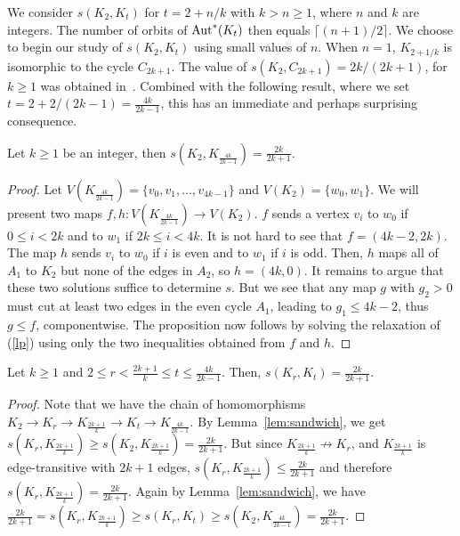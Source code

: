 \documentclass[11pt,a4paper]{article}
\begin{document}
We consider $s(K_2, K_{t})$ for
$t = 2 + n/k$ with $k > n \geq 1$, where $n$ and $k$ are integers.
The number of orbits of $\mbox{\rm Aut}^*(K_{t})$ then equals $\lceil (n+1)/2 \rceil$.
We choose to begin our study of $s(K_2, K_{t})$ using small values of $n$.
When $n = 1$, $K_{2+1/k}$ is isomorphic to the cycle $C_{2k+1}$.
The value of $s(K_2,C_{2k+1}) = 2k/(2k+1)$, for $k \geq 1$ 
was obtained in~\cite{farnqvist:etal:09}.
Combined with the following result, where we set $t = 2+2/(2k-1) = \frac{4k}{2k-1}$, 
this has an immediate and perhaps surprising consequence.
\begin{proposition}
\label{prop:4k+4}
Let $k\geq 1$ be an integer, then $s(K_2,K_{\frac{4k}{2k-1}})=\frac{2k}{2k+1}$.
\end{proposition}
\begin{proof}
Let $V(K_{\frac{4k}{2k-1}})= \{v_0,v_1,\ldots,v_{4k-1}\}$ and $V(K_2) =\{w_0,w_1\}$.
We will present two maps $f, h : V(K_{\frac{4k}{2k-1}}) \rightarrow V(K_2)$.
$f$ sends a vertex $v_i$ to $w_0$ if $0 \leq i < 2k$ and to $w_1$ if
$2k \leq i < 4k$.
It is not hard to see that $f = (4k-2, 2k)$.
The map $h$ sends $v_i$ to $w_0$ if $i$ is even and to $w_1$ if $i$ is odd.
Then, $h$ maps all of $A_1$ to $K_2$ but none of the edges in $A_2$,
so $h = (4k,0)$.
It remains to argue that these two solutions suffice to determine $s$.
But we see that any map $g$ with $g_2 > 0$ must cut at least two edges in
the even cycle $A_1$, leading to $g_1 \leq 4k-2$, thus $g \leq f$,
componentwise.
The proposition now follows by solving the relaxation of (\ref{lp})
using only the two inequalities obtained from $f$ and $h$.
\end{proof}

\begin{corollary}
\label{cor:intervals}
Let $k \geq 1$ and $2 \leq r < \frac{2k+1}{k} \leq t \leq \frac{4k}{2k-1}$.
Then, $s(K_r,K_{t}) = \frac{2k}{2k+1}$.
\end{corollary}
\begin{proof}
  Note that we have the chain of homomorphisms
  $K_2 \rightarrow K_r \rightarrow K_{\frac{2k+1}{k}} \rightarrow K_t \rightarrow K_{\frac{4k}{2k-1}}$.
  By Lemma~\ref{lem:sandwich}, we get $s(K_r,K_{\frac{2k+1}{k}}) \geq s(K_2,K_{\frac{2k+1}{k}}) = \frac{2k}{2k+1}$. But since $K_{\frac{2k+1}{k}} \not\rightarrow K_r$, and $K_{\frac{2k+1}{k}}$ is edge-transitive with $2k+1$ edges, $s(K_r, K_{\frac{2k+1}{k}}) \leq \frac{2k}{2k+1}$ and therefore $s(K_r,K_{\frac{2k+1}{k}}) =  \frac{2k}{2k+1}$. 
  Again by Lemma~\ref{lem:sandwich}, we have
  $
  \frac{2k}{2k+1} = s(K_r, K_{\frac{2k+1}{k}}) \geq s(K_r, K_{t}) \geq s(K_2, K_{\frac{4k}{2k-1}}) = \frac{2k}{2k+1}.
  $
\end{proof}
\end{document}

